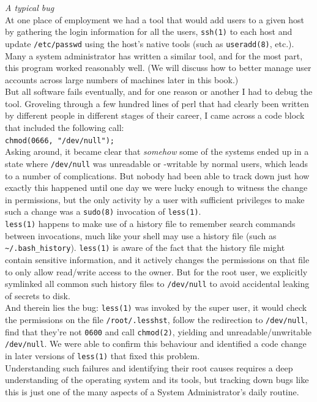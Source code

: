 \begin{experience}
{\em A typical bug} \\

At one place of employment we had a tool that would
add users to a given host by gathering the login
information for all the users, \verb+ssh(1)+ to each
host and update \verb+/etc/passwd+ using the host's
native tools (such as \verb+useradd(8)+, etc.). Many a
system administrator has written a similar tool, and
for the most part, this program worked reasonably
well. (We will discuss how to better manage user
accounts across large numbers of machines later in
this book.) \\ [10pt]

But all software fails eventually, and for one reason
or another I had to debug the tool. Groveling through
a few hundred lines of perl that had clearly been
written by different people in different stages of
their career, I came across a code block that included
the following call: \\ [10pt]

\verb+chmod(0666, "/dev/null");+ \\ [10pt]

Asking around, it became clear that {\em somehow} some
of the systems ended up in a state where
{\tt /dev/null} was unreadable
or -writable by normal users, which leads to a number
of complications.  But nobody had been able to track
down just how exactly this happened until one day we
were lucky enough to witness the change in
permissions,  but the only activity by a user with
sufficient privileges to make such a change was a
\verb+sudo(8)+ invocation of \verb+less(1)+. \\
[10pt]

\verb+less(1)+ happens to make use of a history file
to remember search commands between invocations, much
like your shell may use a history file (such as
\verb+~/.bash_history+). \verb+less(1)+ is aware of
the fact that the history file might contain sensitive
information, and it actively changes the permissions
on that file to only allow read/write access to the
owner.  But for the root user, we explicitly symlinked
all common such history files to \verb+/dev/null+ to
avoid accidental leaking of secrets to disk. \\ [10pt]

And therein lies the bug: \verb+less(1)+ was invoked
by the super user, it would check the permissions on
the file \verb+/root/.lesshst+, follow the redirection
to \verb+/dev/null+, find that they're not \verb+0600+
and call \verb+chmod(2)+, yielding and
unreadable/unwritable \verb+/dev/null+.  We were able
to confirm this behaviour and identified a code change
in later versions of \verb+less(1)+ that fixed this
problem. \\ [10pt]

Understanding such failures and identifying their root
causes requires a deep understanding of the operating
system and its tools, but tracking down bugs like
this\cite{intro:devnull} is just one of the many
aspects of a System Administrator's daily routine.

\end{experience}


